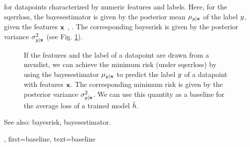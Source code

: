 {{	for \glspl{datapoint} characterized by numeric \glspl{feature} and \glspl{label}.
	Here, for the \gls{sqerrloss}, the \gls{bayesestimator} is given by the posterior 
	\gls{mean} $\mu_{y|{\bf x}}$ of the \gls{label} $y$, given the 
	\glspl{feature} ${\bf x}$ \cite{LC}, \cite{GrayProbBook}. The corresponding \gls{bayesrisk} 
	is given by the posterior \gls{variance} 
	$\sigma^{2}_{y|{\bf x}}$ (see Fig. \ref{fig_post_baseline_dict}).
	\begin{figure}[H]
		\begin{center}
		\end{center}
		\caption{If the \glspl{feature} and the \gls{label} of a \gls{datapoint} are drawn from a \gls{mvndist}, we 
		can achieve the \gls{minimum} \gls{risk} (under \gls{sqerrloss}) by using the \gls{bayesestimator} $\mu_{y|{\bf x}}$ 
		to predict the \gls{label} $y$ of a \gls{datapoint} with \glspl{feature} ${\bf x}$. The corresponding 
		\gls{minimum} \gls{risk} is given by the posterior \gls{variance} $\sigma^{2}_{y|{\bf x}}$. We can use 
		this quantity as a baseline for the average \gls{loss} of a trained \gls{model} $\hat{h}$. \label{fig_post_baseline_dict}}
		\end{figure}
		See also: \gls{bayesrisk}, \gls{bayesestimator}.},
    first={baseline},
    text={baseline}
}

